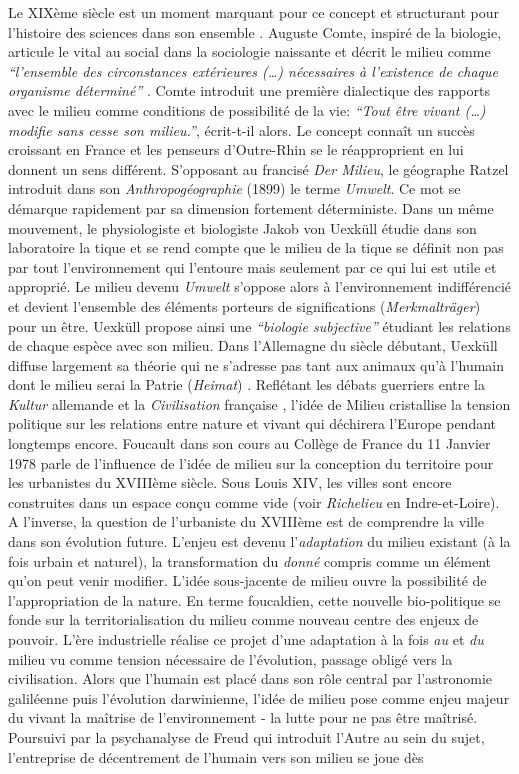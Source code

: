 Le XIXème siècle est un moment marquant pour ce concept et structurant pour l’histoire des sciences dans son ensemble \citep{Taylan2010}. Auguste Comte, inspiré de la biologie, articule le vital au social dans la sociologie naissante et décrit le milieu comme \textit{``l’ensemble des circonstances extérieures (…) nécessaires à l’existence de chaque organisme déterminé''} \citep{Comte1838}. Comte introduit une première dialectique des rapports avec le milieu comme conditions de possibilité de la vie: \textit{``Tout être vivant (…) modifie sans cesse son milieu.''}, écrit-t-il alors. Le concept connaît un succès croissant en France et les penseurs d’Outre-Rhin se le réapproprient en lui donnent un sens différent. S’opposant au francisé \textit{Der Milieu}, le géographe Ratzel introduit dans son \textit{Anthropogéographie} (1899) le terme \textit{Umwelt}. Ce mot se démarque rapidement par sa dimension fortement déterministe. Dans un même mouvement, le physiologiste et biologiste Jakob von Uexküll étudie dans son laboratoire la tique et se rend compte que le milieu de la tique se définit non pas par tout l’environnement qui l’entoure mais seulement par ce qui lui est utile et approprié. Le milieu devenu \textit{Umwelt} s’oppose alors à l’environnement indifférencié et devient l’ensemble des éléments porteurs de significations (\textit{Merkmalträger}) pour un être. Uexküll propose ainsi une \textit{``biologie subjective''} étudiant les relations de chaque espèce avec son milieu. Dans l’Allemagne du siècle débutant, Uexküll diffuse largement sa théorie qui ne s’adresse pas tant aux animaux qu’à l’humain dont le milieu serai la Patrie (\textit{Heimat}) \citep{Feuerhahn2009}. Reflétant les débats guerriers entre la \textit{Kultur} allemande et la \textit{Civilisation} française \citep{Elias1975}, l’idée de Milieu cristallise la tension politique sur les relations entre nature et vivant qui déchirera l’Europe pendant longtemps encore. Foucault dans son cours au Collège de France du 11 Janvier 1978 parle de l’influence de l’idée de milieu sur la conception du territoire pour les urbanistes du XVIIIème siècle. Sous Louis XIV, les villes sont encore construites dans un espace conçu comme vide (voir \textit{Richelieu} en Indre-et-Loire). A l'inverse, la question de l’urbaniste du XVIIIème est de comprendre la ville dans son évolution future. L’enjeu est devenu l’\textit{adaptation} du milieu existant (à la fois urbain et naturel), la transformation du \textit{donné} compris comme un élément qu’on peut venir modifier. L’idée sous-jacente de milieu ouvre la possibilité de l’appropriation de la nature. En terme foucaldien, cette nouvelle bio-politique se fonde sur la territorialisation du milieu comme nouveau centre des enjeux de pouvoir. L’ère industrielle réalise ce projet d’une adaptation à la fois \textit{au} et \textit{du} milieu vu comme tension nécessaire de l’évolution, passage obligé vers la civilisation. Alors que l’humain est placé dans son rôle central par l’astronomie galiléenne puis l’évolution darwinienne, l’idée de milieu pose comme enjeu majeur du vivant la maîtrise de l’environnement - la lutte pour ne pas être maîtrisé. Poursuivi par la psychanalyse de Freud qui introduit l’Autre au sein du sujet, l’entreprise de décentrement de l’humain vers son milieu se joue dès 